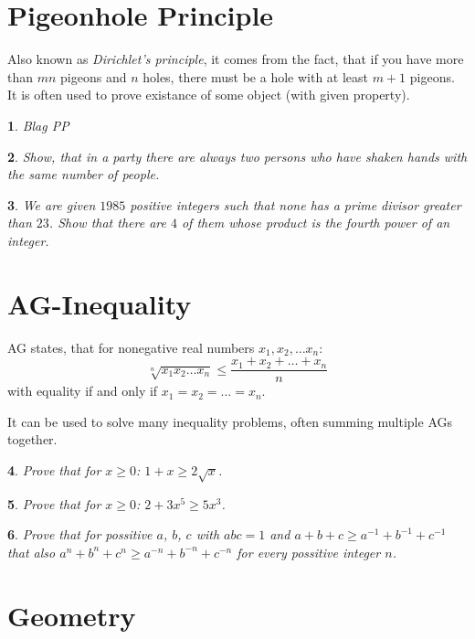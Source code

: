 \documentclass[12pt]{article}
\newtheorem{problem}{}
\begin{document}
\section{Pigeonhole Principle}

Also known as \emph{Dirichlet's principle}, it comes from the fact, that if you have more than $mn$ pigeons and $n$ holes, there must be a hole with at least $m+1$ pigeons. It is often used to prove existance of some object (with given property).

\begin{problem}
Blag PP
\end{problem}

\begin{problem}
Show, that in a party there are always two persons who have shaken hands with the same number of people.
\end{problem}

\begin{problem}
We are given $1985$ positive integers such that none has a prime divisor greater than $23$. Show that there are $4$ of them whose product is the fourth power of an integer.
\end{problem}

\section{AG-Inequality}

AG states, that for nonegative real numbers $x_1, x_2, \dots x_n$: 
\[\sqrt[n]{x_1x_2\dots x_n} \le  \frac{x_1 + x_2 + \dots + x_n}{n}\] 
with equality if and only if $x_1 = x_2 = \dots = x_n$.

It can be used to solve many inequality problems, often summing multiple AGs together.

\begin{problem}
Prove that for $x\ge 0$: $1 + x \ge 2\sqrt{x}$.
\end{problem}
\begin{problem}
Prove that for $x\ge 0$: $2 + 3x^5 \ge 5x^3$.
\end{problem}
\begin{problem}
Prove that for possitive $a$, $b$, $c$ with $abc = 1$ and $a+b+c \ge a^{-1} + b^{-1} + c^{-1}$ that also $a^n+b^n+c^n \ge a^{-n} + b^{-n} + c^{-n}$ for every possitive integer $n$.
\end{problem}

\section{Geometry}
\end{document}
